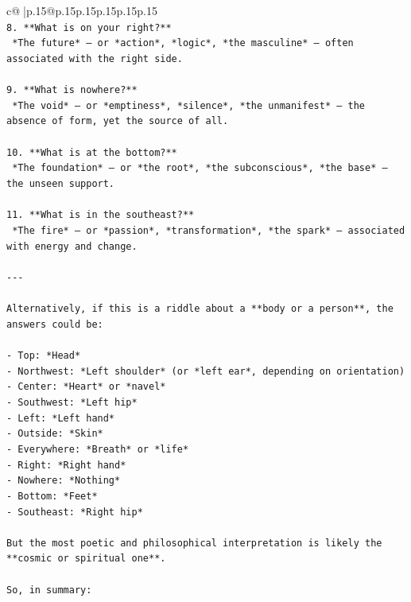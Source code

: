 \documentclass{article}
\begin{document}
{\begin{supertabular}{c@{$\;$}|p{.15\linewidth}@{}p{.15\linewidth}p{.15\linewidth}p{.15\linewidth}p{.15\linewidth}p{.15\linewidth}}
{{{\\ 
\texttt{8. **What is on your right?**  } \\
\texttt{   *The future* — or *action*, *logic*, *the masculine* — often associated with the right side.} \\
\\ 
\texttt{9. **What is nowhere?**  } \\
\texttt{   *The void* — or *emptiness*, *silence*, *the unmanifest* — the absence of form, yet the source of all.} \\
\\ 
\texttt{10. **What is at the bottom?**  } \\
\texttt{   *The foundation* — or *the root*, *the subconscious*, *the base* — the unseen support.} \\
\\ 
\texttt{11. **What is in the southeast?**  } \\
\texttt{   *The fire* — or *passion*, *transformation*, *the spark* — associated with energy and change.} \\
\\ 
\texttt{{-}{-}{-}} \\
\\ 
\texttt{Alternatively, if this is a riddle about a **body or a person**, the answers could be:} \\
\\ 
\texttt{{-} Top: *Head*  } \\
\texttt{{-} Northwest: *Left shoulder* (or *left ear*, depending on orientation)  } \\
\texttt{{-} Center: *Heart* or *navel*  } \\
\texttt{{-} Southwest: *Left hip*  } \\
\texttt{{-} Left: *Left hand*  } \\
\texttt{{-} Outside: *Skin*  } \\
\texttt{{-} Everywhere: *Breath* or *life*  } \\
\texttt{{-} Right: *Right hand*  } \\
\texttt{{-} Nowhere: *Nothing*  } \\
\texttt{{-} Bottom: *Feet*  } \\
\texttt{{-} Southeast: *Right hip*} \\
\\ 
\texttt{But the most poetic and philosophical interpretation is likely the **cosmic or spiritual one**.} \\
\\ 
\texttt{So, in summary:} \\
}}}
\end{supertabular}}
\end{document}

